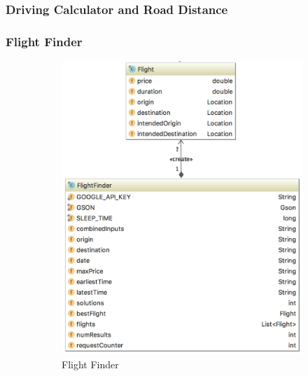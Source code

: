 \documentclass[11pt]{article}
\begin{document}
\subsubsection{Driving Calculator and Road Distance}

\subsubsection{Flight Finder}

\begin{figure}
\centering
\begin{subfigure}{.4\textwidth}
\centering
  \includegraphics[width=1\linewidth]{FlightFinder.png}
  \caption{Flight Finder}
  \label{fig:flfinder}
\end{subfigure}%
\begin{subfigure}{.6\textwidth}
\centering

\end{subfigure}
\end{figure}
\end{document}
